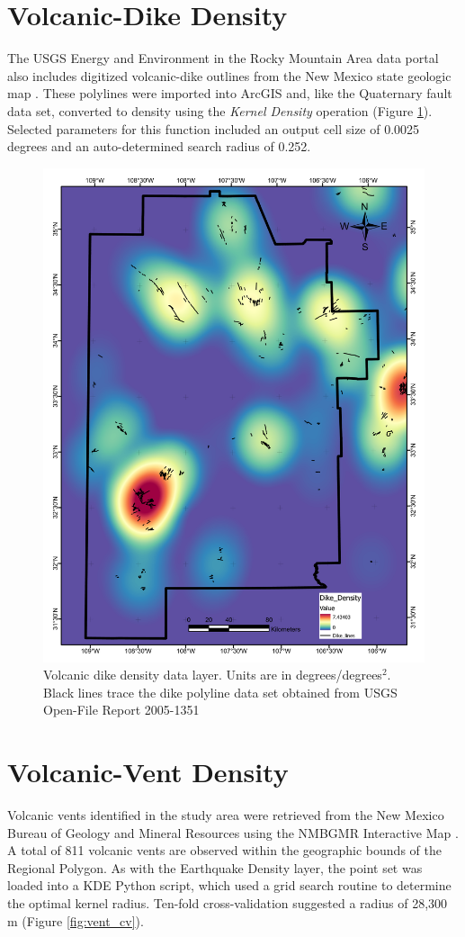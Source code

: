 \section{Volcanic-Dike Density}\label{app:dl_dike_density}
The USGS Energy and Environment in the Rocky Mountain Area data portal \citep{usgs_eerma_2021} also includes digitized volcanic-dike outlines from the New Mexico state geologic map \citep{stoeser_usgs_2005}. These polylines were imported into ArcGIS and, like the Quaternary fault data set, converted to density using the \textit{Kernel Density} operation (Figure \ref{fig:feat_dikes}). Selected parameters for this function included an output cell size of 0.0025 degrees and an auto-determined search radius of 0.252.

\begin{figure}[H]
\centering
\includegraphics[width=0.75\linewidth]{templates/images/Figure-DikeDensity.pdf}
\caption[Volcanic dike data layer]{Volcanic dike density data layer. Units are in degrees/degrees$^2$. Black lines trace the dike polyline data set obtained from USGS Open-File Report 2005-1351 \protect\citep{stoeser_usgs_2005}}
\label{fig:feat_dikes}
\end{figure}
\pagebreak

\section{Volcanic-Vent Density}\label{app:dl_vent_density}
Volcanic vents identified in the study area were retrieved from the New Mexico Bureau of Geology and Mineral Resources using the NMBGMR Interactive Map \citep{nmbgmr_nmbgmr_2021}. A total of 811 volcanic vents are observed within the geographic bounds of the Regional Polygon. As with the Earthquake Density layer, the point set was loaded into a KDE Python script, which used a grid search routine to determine the optimal kernel radius. Ten-fold cross-validation suggested a radius of 28,300 m (Figure \ref{fig:vent_cv}).

